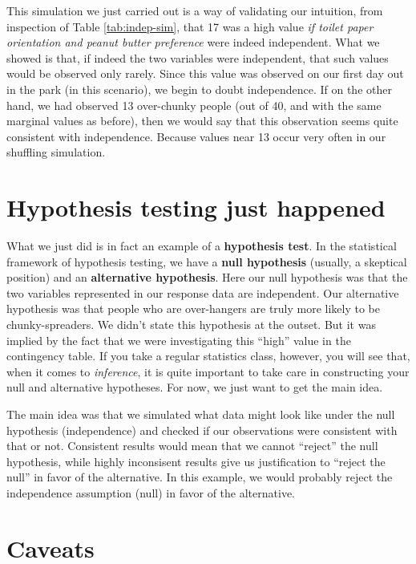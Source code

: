 \documentclass[openany]{book}
\begin{document}
This simulation we just carried out is a way of validating our intuition, from inspection of Table \ref{tab:indep-sim}, that 17 was a high value \emph{if toilet paper orientation and peanut butter preference} were indeed independent. What we showed is that, if indeed the two variables were independent, that such values would be observed only rarely. Since this value was observed on our first day out in the park (in this scenario), we begin to doubt independence. If on the other hand, we had observed 13 over-chunky people (out of 40, and with the same marginal values as before), then we would say that this observation seems quite consistent with independence. Because values near 13 occur very often in our shuffling simulation.

\hypertarget{hypothesis-testing-just-happened}{%
\section*{Hypothesis testing just happened}\label{hypothesis-testing-just-happened}}

What we just did is in fact an example of a \textbf{hypothesis test}. In the statistical framework of hypothesis testing, we have a \textbf{null hypothesis} (usually, a skeptical position) and an \textbf{alternative hypothesis}. Here our null hypothesis was that the two variables represented in our response data are independent. Our alternative hypothesis was that people who are over-hangers are truly more likely to be chunky-spreaders. We didn't state this hypothesis at the outset. But it was implied by the fact that we were investigating this ``high'' value in the contingency table. If you take a regular statistics class, however, you will see that, when it comes to \emph{inference}, it is quite important to take care in constructing your null and alternative hypotheses. For now, we just want to get the main idea.

The main idea was that we simulated what data might look like under the null hypothesis (independence) and checked if our observations were consistent with that or not. Consistent results would mean that we cannot ``reject'' the null hypothesis, while highly inconsisent results give us justification to ``reject the null'' in favor of the alternative. In this example, we would probably reject the independence assumption (null) in favor of the alternative.

\hypertarget{caveats}{%
\section*{Caveats}\label{caveats}}
\end{document}
